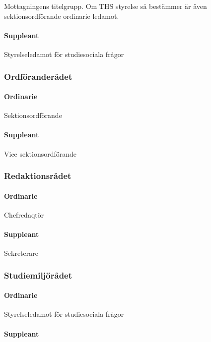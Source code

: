 \documentclass{dgovdoc}
\begin{document}
Mottagningens titelgrupp. Om THS styrelse så bestämmer är även
sektionsordförande ordinarie ledamot.

\paragraph{Suppleant}

Styrelseledamot för studiesociala frågor

\subsubsection{Ordföranderådet}

\paragraph{Ordinarie}

Sektionsordförande

\paragraph{Suppleant}

Vice sektionsordförande

\subsubsection{Redaktionsrådet}

\paragraph{Ordinarie}

Chefredaqtör

\paragraph{Suppleant}

Sekreterare

\subsubsection{Studiemiljörådet}

\paragraph{Ordinarie}

Styrelseledamot för studiesociala frågor

\paragraph{Suppleant}
\end{document}
